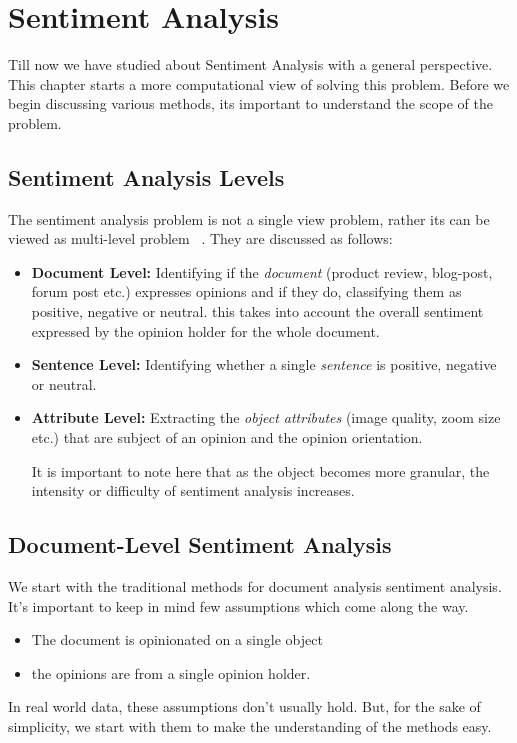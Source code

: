 \chapter{Sentiment Analysis}\label{chapter:sentiment}
Till now we have studied about Sentiment Analysis with a general perspective. This chapter starts a more computational view of solving this problem. Before we begin discussing various methods, its important to understand the scope of the problem. 
\section{Sentiment Analysis Levels}
The sentiment analysis problem is not a single view problem, rather its can be viewed as multi-level problem~\parencite{ch2:icdmtutorial} . They are discussed as follows:
\begin{itemize}
\item \textbf{Document Level: }Identifying if the \textit{document} (product review, blog-post, forum post etc.) expresses opinions and if they do, classifying them as positive, negative or neutral. this takes into account the overall sentiment expressed by the opinion holder for the whole document.  
\item \textbf{Sentence Level: }Identifying whether a single \textit{sentence} is positive, negative or neutral.
\item \textbf{Attribute Level: }Extracting the \textit{object attributes} (image quality, zoom size etc.) that are subject of an opinion and the opinion orientation.

It is important to note here that as the object becomes more granular, the intensity or difficulty of sentiment analysis increases.
\end{itemize}

\section{Document-Level Sentiment Analysis}
We start with the traditional methods for document analysis sentiment analysis. It's important to keep in mind few assumptions which come along the way. 
\begin{itemize}
\item The document is opinionated on a single object
\item the opinions are from a single opinion holder.
\end{itemize}
In real world data, these assumptions don't usually hold. But, for the sake of simplicity, we start with them to make the understanding of the methods easy.

